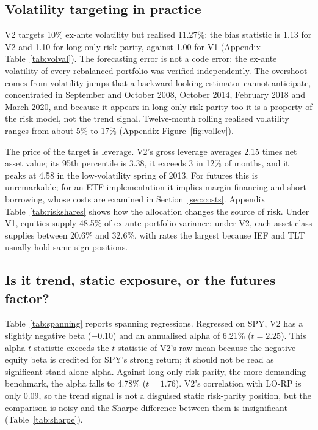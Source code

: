 \documentclass[11pt,a4paper]{article}
\begin{document}
\subsection{Volatility targeting in practice}
\label{sec:voltarg}

V2 targets 10\% ex-ante volatility but realised 11.27\%: the bias statistic is 1.13 for V2 and 1.10 for long-only risk parity, against 1.00 for V1 (Appendix Table~\ref{tab:volval}). The forecasting error is not a code error: the ex-ante volatility of every rebalanced portfolio was verified independently. The overshoot comes from volatility jumps that a backward-looking estimator cannot anticipate, concentrated in September and October 2008, October 2014, February 2018 and March 2020, and because it appears in long-only risk parity too it is a property of the risk model, not the trend signal. Twelve-month rolling realised volatility ranges from about 5\% to 17\% (Appendix Figure~\ref{fig:vollev}).

The price of the target is leverage. V2's gross leverage averages 2.15 times net asset value; its 95th percentile is 3.38, it exceeds 3 in 12\% of months, and it peaks at 4.58 in the low-volatility spring of 2013. For futures this is unremarkable; for an ETF implementation it implies margin financing and short borrowing, whose costs are examined in Section~\ref{sec:costs}. Appendix Table~\ref{tab:riskshares} shows how the allocation changes the source of risk. Under V1, equities supply 48.5\% of ex-ante portfolio variance; under V2, each asset class supplies between 20.6\% and 32.6\%, with rates the largest because IEF and TLT usually hold same-sign positions.

\subsection{Is it trend, static exposure, or the futures factor?}

Table~\ref{tab:spanning} reports spanning regressions. Regressed on SPY, V2 has a slightly negative beta ($-0.10$) and an annualised alpha of 6.21\% ($t = 2.25$). This alpha $t$-statistic exceeds the $t$-statistic of V2's raw mean because the negative equity beta is credited for SPY's strong return; it should not be read as significant stand-alone alpha. Against long-only risk parity, the more demanding benchmark, the alpha falls to 4.78\% ($t = 1.76$). V2's correlation with LO-RP is only 0.09, so the trend signal is not a disguised static risk-parity position, but the comparison is noisy and the Sharpe difference between them is insignificant (Table~\ref{tab:sharpe}).
\end{document}

